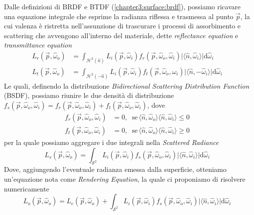 Dalle definizioni di BRDF e BTDF (\ref{chapter3:surface:brdf}), possiamo ricavare una equazione integrale che esprime 
la radianza riflessa e trasmessa al punto $\vec{p}$, la cui valenza \`e ristretta nell'assunzione di trascurare i processi di assorbimento 
e scattering che avvengono all'interno del materiale, dette \textit{reflectance equation} e \textit{transmittance equation}
\begin{align}
	L_r(\vec{p},\hat{\omega}_o) &= \int_{\mathcal{H}^2(\hat{n})}L_i(\vec{p},\hat{\omega}_i)f_r(\vec{p},\hat{\omega}_o,\hat{\omega}_i)%
		\vert\langle\hat{n},\hat{\omega}_i\rangle\vert\mathrm{d}\hat{\omega}_i \\
	L_t(\vec{p},\hat{\omega}_o) &= \int_{\mathcal{H}^2(-\hat{n})}L_i(\vec{p},\hat{\omega}_i)f_t(\vec{p},\hat{\omega}_o,\hat{\omega}_i)%
		\vert\langle\hat{n},-\hat{\omega}_i\rangle\vert\mathrm{d}\hat{\omega}_i
\end{align}
Le quali, definendo la distribuzione \textit{Bidirectional Scattering Distribution Function} (BSDF), possiamo riunire le due densit\`a di distribuzione
\\\mbox{$f_s(\vec{p},\hat{\omega}_o,\hat{\omega}_i) = f_r(\vec{p},\hat{\omega}_o,\hat{\omega}_i) + f_t(\vec{p},\hat{\omega}_o,\hat{\omega}_i)$}, dove
\begin{align}
	f_r(\vec{p},\hat{\omega}_o,\hat{\omega}_i) &= 0,\;\;\mathrm{se}\,\langle\hat{n},\hat{\omega}_o\rangle\langle\hat{n},\hat{\omega}_i\rangle\leq0\\
	f_t(\vec{p},\hat{\omega}_o,\hat{\omega}_i) &= 0,\;\;\mathrm{se}\,\langle\hat{n},\hat{\omega}_o\rangle\langle\hat{n},\hat{\omega}_i\rangle\geq0
\end{align}
per la quale possiamo aggregare i due integrali nella \textit{Scattered Radiance}\footnotemark{}
\begin{equation}\label{chapter3:surface:reflectanceEq}
	L_s(\vec{p},\hat{\omega}_o) = \int_{\mathcal{S}^2}L_i(\vec{p},\hat{\omega}_i)f_s(\vec{p},\hat{\omega}_o,\hat{\omega}_i)%
		\vert\langle\hat{n},\hat{\omega}_i\rangle\vert\mathrm{d}\hat{\omega}_i
\end{equation}
Dove, aggiungendo l'eventuale radianza emessa dalla superficie, otteniamo un'equazione nota come \textit{Rendering Equation}, la quale ci proponiamo
di risolvere numericamente
\begin{equation}
	L_o(\vec{p},\hat{\omega}_o) %
		= L_e(\vec{p},\hat{\omega}_o) + \int_{\mathcal{S}^2}L_i(\vec{p},\hat{\omega}_i)f_s(\vec{p},\hat{\omega}_o,\hat{\omega}_i)
		\vert\langle\hat{n},\hat{\omega}_i\rangle\vert\mathrm{d}\hat{\omega}_i
\end{equation}
